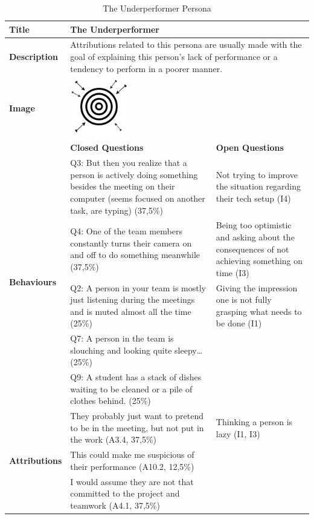 \begin{longtable}[ht]{ p{}  p{} p{} }
\caption{The Underperformer Persona}
\label{tab:underperformer}\\
\hline
\textbf{Title} & The Underperformer \\
    \hline
   \textbf{Description} &  \multicolumn{2}{p{.80\textwidth}}{Attributions related to this persona are usually made with the goal of explaining this person's lack of performance or a tendency to perform in a poorer manner.} \\
   \hline
   \textbf{Image} &  \includegraphics[valign=t, width=1in, margin=0pt 3pt 0pt 3pt]{figures/OffTarget.png} \\
   \hline
    & \textbf{Closed Questions} & \textbf{Open Questions} \\
    \hline
    \multirow{5}{4cm}{\textbf{Behaviours}}  & Q3: But then you realize that a person is actively doing something besides the meeting on their computer (seems focused on another task, are typing) (37,5\%)  & Not trying to improve the situation regarding their tech setup (I4) \\
     & Q4: One of the team members constantly turns their camera on and off to do something meanwhile (37,5\%) & Being too optimistic and asking about the consequences of not achieving something on time (I3) \\
     & Q2: A person in your team is mostly just listening during the meetings and is muted almost all the time (25\%) &  Giving the impression one is not fully grasping what needs to be done (I1) \\
 	 & Q7: A person in the team is slouching and looking quite sleepy…(25\%)  \\
 	 & Q9: A student has a stack of dishes waiting to be cleaned or a pile of clothes behind. (25\%)  \\
    \hline
    \multirow{7}{4cm}{\textbf{Attributions}}  & They probably just want to pretend to be in the meeting, but not put in the work (A3.4, 37,5\%) & Thinking a person is lazy (I1, I3) \\
     & This could make me suspicious of their performance (A10.2, 12,5\%) \\
     & I would assume they are not that committed to the project and teamwork (A4.1, 37,5\%) \\

\end{longtable}
